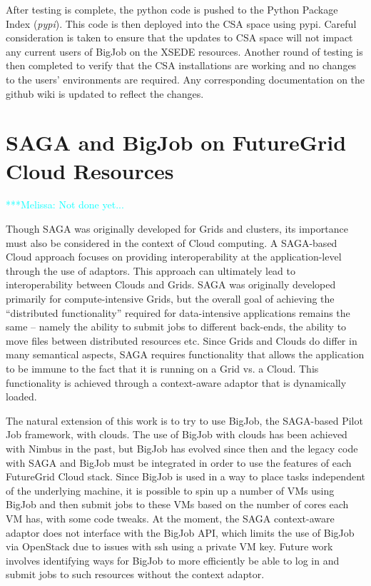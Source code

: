 \documentclass[]{paper}
\newcommand{\mrnote}[1]{ {\textcolor{cyan} { ***Melissa: #1 }}}
\newcommand{\mrnote}[1]{}
\begin{document}
After testing is complete, the python code is pushed to the Python
Package Index (\textit{pypi}). This code is then deployed into the CSA
space using pypi. Careful consideration is taken to ensure that the
updates to CSA space will not impact any current users of BigJob on
the XSEDE resources. Another round of testing is then completed to
verify that the CSA installations are working and no changes to the
users' environments are required. Any corresponding documentation on
the github wiki is updated to reflect the changes.

\section{SAGA and BigJob on FutureGrid Cloud Resources}

\mrnote{Not done yet...}

Though SAGA was originally developed for Grids and clusters, its importance must also be considered in the context of Cloud computing. A SAGA-based Cloud approach focuses on providing interoperability at the application-level through the use of adaptors. This approach can ultimately lead to interoperability between Clouds and Grids. SAGA was originally developed primarily for compute-intensive Grids, but the overall goal of achieving the ``distributed functionality'' required for data-intensive applications
remains the same -- namely the ability to submit jobs to different back-ends, the ability to move files between distributed resources
etc. Since Grids and Clouds do differ in many semantical aspects, SAGA requires functionality that allows the application to be immune to the fact that it is running on a Grid vs. a Cloud. This functionality is achieved through a context-aware adaptor
that is dynamically loaded. 

The natural extension of this work is to try to use BigJob, the SAGA-based Pilot Job framework, with clouds. The use of BigJob with clouds has been achieved with Nimbus in the past, but BigJob has evolved since then and the legacy code with SAGA and BigJob must be integrated in order to use the features of each FutureGrid Cloud stack. Since BigJob is used in a way to place tasks independent of the underlying machine, it is possible to spin up a number of VMs using BigJob and then submit jobs to these VMs based on the number of cores each VM has, with some code tweaks. At the moment, the SAGA context-aware adaptor does not interface with the BigJob API, which limits the use of BigJob via OpenStack due to issues with ssh using a private VM key. Future work involves identifying ways for BigJob to more efficiently be able to log in and submit jobs to such resources without the context adaptor.
\end{document}
